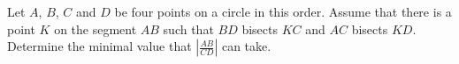 Let $A$, $B$, $C$ and $D$ be four points on a circle in this order.
Assume that there is a point $K$ on the segment $AB$ such that $BD$ bisects $KC$ and $AC$ bisects $KD$.
Determine the minimal value that $\left|\frac{AB}{CD}\right|$ can take.
